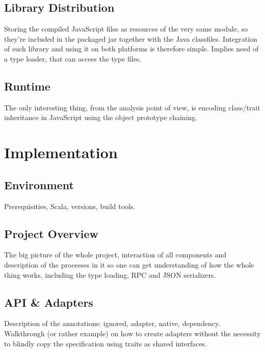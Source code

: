 \documentclass[12pt,a4paper]{report}
\begin{document}
\section{Library Distribution}

Storing the compiled JavaScript files as resources of the very same module, so they're included in the packaged jar together with the Java classfiles. Integration of such library and using it on both platforms is therefore simple. Implies need of a type loader, that can access the type files.

\section{Runtime}

The only interesting thing, from the analysis point of view, is encoding class/trait inheritance in JavaScript using the object prototype chaining.








\chapter{Implementation}

\section{Environment}

Prerequisities, Scala, versions, build tools.

\section{Project Overview}

The big picture of the whole project, interaction of all components and description of the processes in it so one can get understanding of how the whole thing works, including the type loading, RPC and JSON serializers.

\section{API \& Adapters}

Description of the annotations: ignored, adapter, native, dependency. Walkthrough (or rather example) on how to create adapters without the necessity to blindly copy the specification using traits as shared interfaces.
\end{document}
